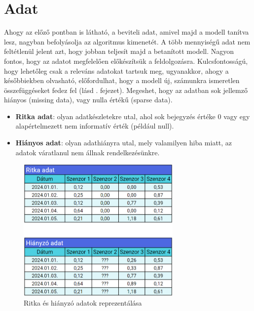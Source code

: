 \documentclass[
]{thesis-ekf}
\theoremstyle{definition}
\theoremstyle{remark}
\begin{document}
\section{Adat}
\label{sec-adat}
	Ahogy az előző pontban is látható, a beviteli adat, amivel majd a modell tanítva lesz, nagyban befolyásolja az algoritmus kimenetét. A több mennyiségű adat nem feltétlenül jelent azt, hogy jobban teljesít majd a betanított modell. Nagyon fontos, hogy az adatot megfelelően előkészítsük a feldolgozásra. Kulcsfontosságú, hogy lehetőleg csak a releváns adatokat tartsuk meg, ugyanakkor, ahogy a későbbiekben olvasható, előfordulhat, hogy a modell új, számunkra ismeretlen összefüggéseket fedez fel (lásd . fejezet). Megeshet, hogy az adatban sok jellemző hiányos (missing data), vagy nulla értékű (sparse data).
	
	\begin{itemize}\label{sparse-data}
		\item \textbf{Ritka adat}: olyan adatkészletekre utal, ahol sok bejegyzés értéke 0 vagy egy alapértelmezett nem informatív érték (például null).
		\item \textbf{Hiányos adat}: olyan adathiányra utal, mely valamilyen hiba miatt, az adatok váratlanul nem állnak rendelkezésünkre.
	\end{itemize}
	
	\begin{figure}[!h]
		\centering
		\includegraphics[width=8cm]{images/ritka-es-hianyzo-adat.png}
		\caption[Ritka és hiányzó adatok reprezentálása]{Ritka és hiányzó adatok reprezentálása\footnotemark}
		\label{ritka-es-hianyzo-adat}
	\end{figure}
\end{document}
